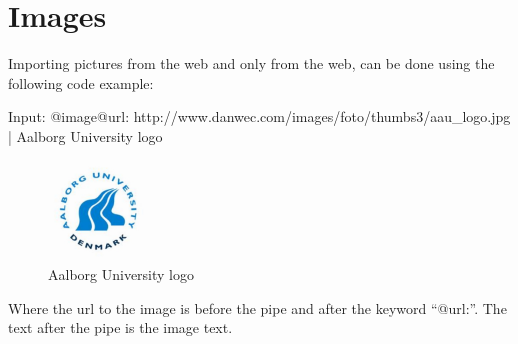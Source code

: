 \section{Images}
Importing pictures from the web and only from the web, can be done using the following code example:

\begin{spverbatim}
Input: @image{@url: http://www.danwec.com/images/foto/thumbs3/aau_logo.jpg  | Aalborg University logo}
\end{spverbatim}

\begin{figure}[! h]
\centering
	 \includegraphics[width=100px]{images/aau_logo.jpg}
		 \caption{Aalborg University logo}	
	\label{fig:Imageimport}
\end{figure}

Where the url to the image is before the pipe and after the keyword ``@url:''. The text after the pipe is the image text.